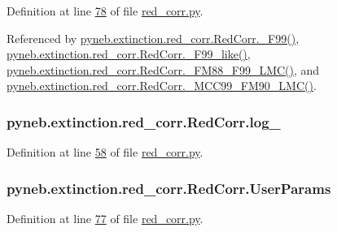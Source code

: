 \begin{DoxyVerb}
Definition at line \hyperlink{red__corr_8py_source_l00078}{78} of file \hyperlink{red__corr_8py_source}{red\-\_\-corr.\-py}.



Referenced by \hyperlink{red__corr_8py_source_l00822}{pyneb.\-extinction.\-red\-\_\-corr.\-Red\-Corr.\-\_\-\-F99()}, \hyperlink{red__corr_8py_source_l00658}{pyneb.\-extinction.\-red\-\_\-corr.\-Red\-Corr.\-\_\-\-F99\-\_\-like()}, \hyperlink{red__corr_8py_source_l00851}{pyneb.\-extinction.\-red\-\_\-corr.\-Red\-Corr.\-\_\-\-F\-M88\-\_\-\-F99\-\_\-\-L\-M\-C()}, and \hyperlink{red__corr_8py_source_l00789}{pyneb.\-extinction.\-red\-\_\-corr.\-Red\-Corr.\-\_\-\-M\-C\-C99\-\_\-\-F\-M90\-\_\-\-L\-M\-C()}.

\hypertarget{classpyneb_1_1extinction_1_1red__corr_1_1_red_corr_a712aff76d06f15896ed30e689103f66d}{
\subsubsection[{log\-\_\-}]{\setlength{\rightskip}{0pt plus 5cm}pyneb.\-extinction.\-red\-\_\-corr.\-Red\-Corr.\-log\-\_\-}}\label{classpyneb_1_1extinction_1_1red__corr_1_1_red_corr_a712aff76d06f15896ed30e689103f66d}


Definition at line \hyperlink{red__corr_8py_source_l00058}{58} of file \hyperlink{red__corr_8py_source}{red\-\_\-corr.\-py}.

\hypertarget{classpyneb_1_1extinction_1_1red__corr_1_1_red_corr_a7e1e251a6bd48ed36428c4654af46606}{
\subsubsection[{User\-Params}]{\setlength{\rightskip}{0pt plus 5cm}pyneb.\-extinction.\-red\-\_\-corr.\-Red\-Corr.\-User\-Params}}\label{classpyneb_1_1extinction_1_1red__corr_1_1_red_corr_a7e1e251a6bd48ed36428c4654af46606}


Definition at line \hyperlink{red__corr_8py_source_l00077}{77} of file \hyperlink{red__corr_8py_source}{red\-\_\-corr.\-py}.


\end{DoxyVerb}
